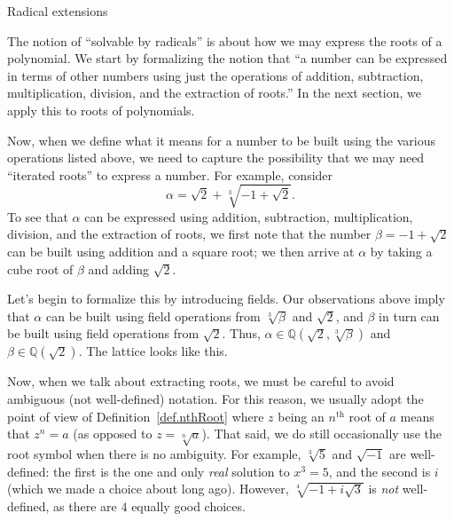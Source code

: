 \begin{section}{Radical extensions}

The notion of ``solvable by radicals'' is about how we may express the roots of a polynomial. We start by formalizing the notion that ``a number can be expressed in terms of other numbers using just the operations of addition, subtraction, multiplication, division, and the extraction of roots.'' In the next section, we apply this to roots of polynomials.

 
Now, when we define what it means for a number to be built using the various operations listed above, we need to capture the possibility that we may need ``iterated roots'' to express a number. For example, consider \[\alpha = \sqrt{2} + \sqrt[3]{-1 + \sqrt{2}}.\]
To see that $\alpha$ can be expressed using addition, subtraction, multiplication, division, and the extraction of roots, we first note that the number $\beta = -1 + \sqrt{2}$ can be built using addition and a square root; we then arrive at $\alpha$ by taking a cube root of $\beta$ and adding $\sqrt{2}$.

Let's begin to formalize this by introducing fields. Our observations above imply that $\alpha$ can be built using field operations from $\sqrt[3]{\beta}$ and $\sqrt{2}$, and $\beta$ in turn can be built using field operations from $\sqrt{2}$. Thus, $\alpha \in \mathbb{Q}\left(\sqrt{2},\sqrt[3]{\beta}\right)$ and $\beta \in \mathbb{Q}\left(\sqrt{2}\right)$. The lattice looks like this.
\begin{center}
\end{center}

Now, when we talk about extracting roots, we must be careful to avoid ambiguous (not well-defined) notation. For this reason, we usually adopt the point of view of Definition~\ref{def.nthRoot} where $z$ being an $n^\text{th}$ root of $a$ means that $z^n = a$ (as opposed to  $z = \sqrt[n]{a}$). That said, we do still occasionally use the root symbol when there is no ambiguity. For example, $\sqrt[3]{5}$ and $\sqrt{-1}$ are well-defined: the first is the one and only \emph{real} solution to $x^3=5$, and the second is $i$ (which we made a choice about long ago). However,  $\sqrt[4]{-1 + i\sqrt{3}}$ is \emph{not} well-defined, as there are $4$ equally good choices.


\end{section}
